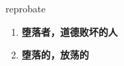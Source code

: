 
\begin{frame}
{\huge reprobate}
\begin{center}
\begin{enumerate}\Large
  \item \textbf{堕落者，道德败坏的人}
  \item \textbf{堕落的，放荡的}
\end{enumerate}
\end{center}
\end{frame}
